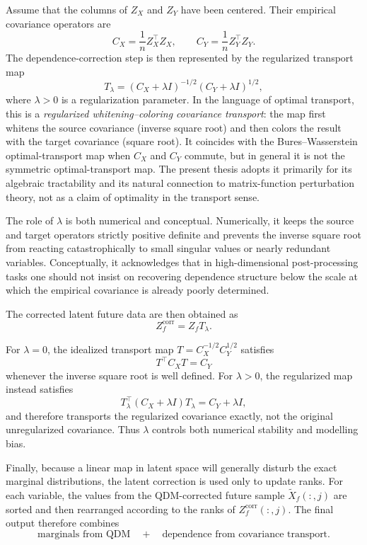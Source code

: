 Assume that the columns of \(Z_X\) and \(Z_Y\) have been centered. Their empirical covariance operators are
\[
	C_X = \frac{1}{n} Z_X^\top Z_X,
	\qquad
	C_Y = \frac{1}{n} Z_Y^\top Z_Y.
\]
The dependence-correction step is then represented by the regularized transport map
\[
	T_\lambda = (C_X + \lambda I)^{-1/2}(C_Y + \lambda I)^{1/2},
\]
where \(\lambda > 0\) is a regularization parameter.  In the language of optimal transport, this is a \emph{regularized whitening--coloring covariance transport}: the map first whitens the source covariance (inverse square root) and then colors the result with the target covariance (square root).  It coincides with the Bures--Wasserstein optimal-transport map when \(C_X\) and \(C_Y\) commute, but in general it is not the symmetric optimal-transport map.  The present thesis adopts it primarily for its algebraic tractability and its natural connection to matrix-function perturbation theory, not as a claim of optimality in the transport sense.

The role of \(\lambda\) is both numerical and conceptual. Numerically, it keeps the source and target operators strictly positive definite and prevents the inverse square root from reacting catastrophically to small singular values or nearly redundant variables. Conceptually, it acknowledges that in high-dimensional post-processing tasks one should not insist on recovering dependence structure below the scale at which the empirical covariance is already poorly determined.

The corrected latent future data are then obtained as
\[
	Z_f^{\mathrm{corr}} = Z_f T_\lambda.
\]

\begin{remark}
	For \(\lambda = 0\), the idealized transport map
	\(T = C_X^{-1/2} C_Y^{1/2}\) satisfies
	\[
		T^\top C_X T = C_Y
	\]
	whenever the inverse square root is well defined. For \(\lambda > 0\), the
	regularized map instead satisfies
	\[
		T_\lambda^\top (C_X + \lambda I) T_\lambda = C_Y + \lambda I,
	\]
	and therefore transports the regularized covariance exactly, not the original
	unregularized covariance. Thus \(\lambda\) controls both numerical stability and
	modelling bias.
\end{remark}

Finally, because a linear map in latent space will generally disturb the exact marginal distributions, the latent correction is used only to update ranks. For each variable, the values from the QDM-corrected future sample \(\widetilde X_f(:,j)\) are sorted and then rearranged according to the ranks of \(Z_f^{\mathrm{corr}}(:,j)\). The final output therefore combines
\[
	\text{marginals from QDM} \quad + \quad \text{dependence from covariance transport}.
\]

